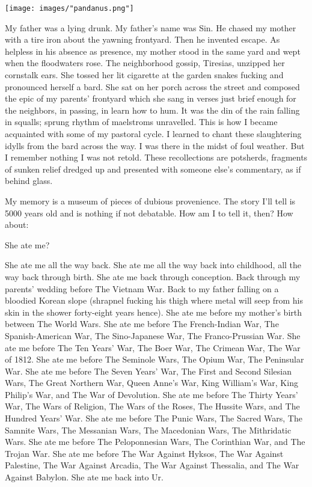 \documentclass[
]{memoir}
\begin{document}
\begin{center}\texttt{[image: images/"pandanus.png"]}\end{center}

My father was a lying drunk. My father's name was Sin. He chased my
mother with a tire iron about the yawning frontyard. Then he invented
escape. As helpless in his absence as presence, my mother stood in the
same yard and wept when the floodwaters rose. The neighborhood gossip,
Tiresias, unzipped her cornstalk ears. She tossed her lit cigarette at
the garden snakes fucking and pronounced herself a bard. She sat on her
porch across the street and composed the epic of my parents' frontyard
which she sang in verses just brief enough for the neighbors, in
passing, in learn how to hum. It was the din of the rain falling in
squalls; sprung rhythm of maelstroms unravelled. This is how I became
acquainted with some of my pastoral cycle. I learned to chant these
slaughtering idylls from the bard across the way. I was there in the
midst of foul weather. But I remember nothing I was not retold. These
recollections are potsherds, fragments of sunken relief dredged up and
presented with someone else's commentary, as if behind glass.

My memory is a museum of pieces of dubious provenience. The story I'll
tell is 5000 years old and is nothing if not debatable. How am I to tell
it, then? How about:

She ate me?

She ate me all the way back. She ate me all the way back into childhood,
all the way back through birth. She ate me back through conception. Back
through my parents' wedding before The Vietnam War. Back to my father
falling on a bloodied Korean slope (shrapnel fucking his thigh where
metal will seep from his skin in the shower forty-eight years hence).
She ate me before my mother's birth between The World Wars. She ate me
before The French-Indian War, The Spanish-American War, The
Sino-Japanese War, The Franco-Prussian War. She ate me before The Ten
Years' War, The Boer War, The Crimean War, The War of 1812. She ate me
before The Seminole Wars, The Opium War, The Peninsular War. She ate me
before The Seven Years' War, The First and Second Silesian Wars, The
Great Northern War, Queen Anne's War, King William's War, King Philip's
War, and The War of Devolution. She ate me before The Thirty Years' War,
The Wars of Religion, The Wars of the Roses, The Hussite Wars, and The
Hundred Years' War. She ate me before The Punic Wars, The Sacred Wars,
The Samnite Wars, The Messanian Wars, The Macedonian Wars, The
Mithridatic Wars. She ate me before The Peloponnesian Wars, The
Corinthian War, and The Trojan War. She ate me before The War Against
Hyksos, The War Against Palestine, The War Against Arcadia, The War
Against Thessalia, and The War Against Babylon. She ate me back into Ur.
\end{document}
